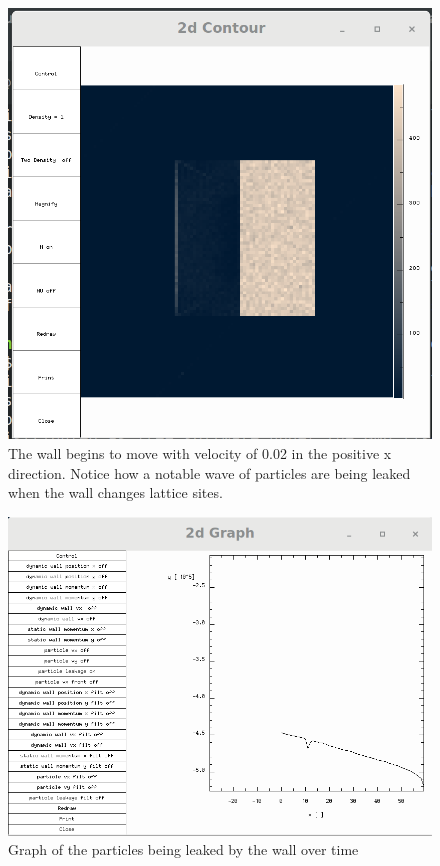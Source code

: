 \documentclass{article}
\begin{document}
\begin{figure}[H]
\includegraphics[scale=0.35]{A11p5.png}
\caption{\label{fig} The wall begins to move with velocity of 0.02 in the positive x direction. Notice how a notable wave of particles are being leaked when the wall changes lattice sites.}
\end{figure}

\begin{figure}[H]
\includegraphics[scale=0.35]{A11p3.png}
\caption{\label{fig} Graph of the particles being leaked by the wall over time}
\end{figure}
\end{document}
